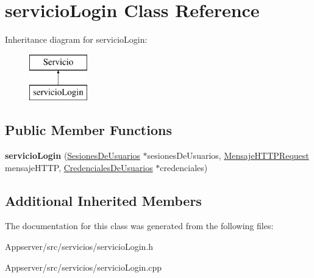 \hypertarget{classservicioLogin}{}\section{servicio\+Login Class Reference}
\label{classservicioLogin}
Inheritance diagram for servicio\+Login\+:\begin{figure}[H]
\begin{center}
\leavevmode
\includegraphics[height=2.000000cm]{classservicioLogin}
\end{center}
\end{figure}
\subsection*{Public Member Functions}
\begin{DoxyCompactItemize}
\item 
{\bfseries servicio\+Login} (\hyperlink{classSesionesDeUsuarios}{Sesiones\+De\+Usuarios} $\ast$sesiones\+De\+Usuarios, \hyperlink{classMensajeHTTPRequest}{Mensaje\+H\+T\+T\+P\+Request} mensaje\+H\+T\+TP, \hyperlink{classCredencialesDeUsuarios}{Credenciales\+De\+Usuarios} $\ast$credenciales)\hypertarget{classservicioLogin_a8987991d7cdd8b2ffa6aa9b802041c9f}{}\label{classservicioLogin_a8987991d7cdd8b2ffa6aa9b802041c9f}

\end{DoxyCompactItemize}
\subsection*{Additional Inherited Members}


The documentation for this class was generated from the following files\+:\begin{DoxyCompactItemize}
\item 
Appserver/src/servicios/servicio\+Login.\+h\item 
Appserver/src/servicios/servicio\+Login.\+cpp\end{DoxyCompactItemize}
